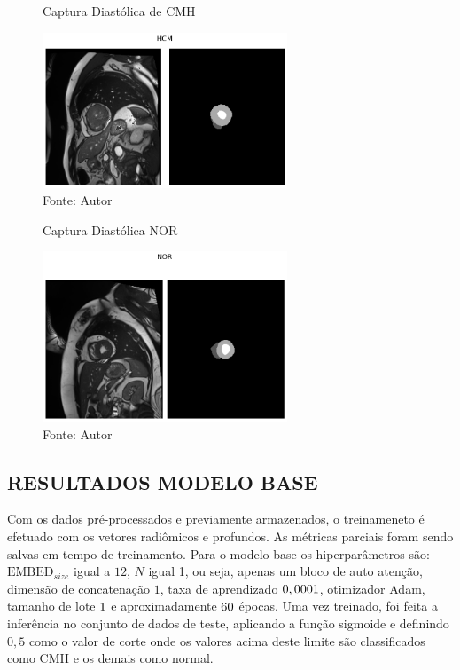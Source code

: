 \begin{figure}[h!]
    \caption{Captura Diastólica de CMH}
    \centering
    \includegraphics[width=0.65\textwidth]{figures/fig019.png}
    \caption*{Fonte: Autor}
    \label{fig:fig019}
\end{figure}

\begin{figure}[h!]
    \centering
    \caption{Captura Diastólica NOR}
    \includegraphics[width=0.65\textwidth]{figures/fig020.png}
    \caption*{Fonte: Autor}
    \label{fig:fig020}
\end{figure}

\subsection{RESULTADOS MODELO BASE}
\label{subsec:resultados_acdc_base}

Com os dados pré-processados e previamente armazenados, o treinameneto é efetuado com os vetores radiômicos e profundos. As métricas parciais foram sendo salvas em tempo de treinamento. Para o modelo base os hiperparâmetros são: $\text{EMBED}_{size}$ igual a $12$, $N$ igual 1, ou seja, apenas um bloco de auto atenção, dimensão de concatenação $1$, taxa de aprendizado $0,0001$, otimizador \gls{Adam}, tamanho de lote $1$ e aproximadamente $60$ épocas. Uma vez treinado, foi feita a inferência no conjunto de dados de teste, aplicando a função sigmoide e definindo $0,5$ como o valor de corte onde os valores acima deste limite são classificados como \gls{CMH} e os demais como normal. 

